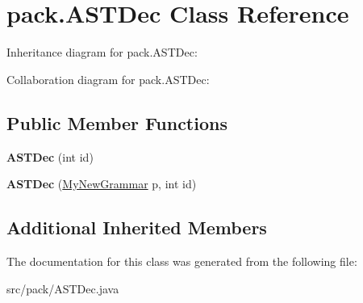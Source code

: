 \hypertarget{classpack_1_1_a_s_t_dec}{}\section{pack.\+A\+S\+T\+Dec Class Reference}
\label{classpack_1_1_a_s_t_dec}


Inheritance diagram for pack.\+A\+S\+T\+Dec\+:


Collaboration diagram for pack.\+A\+S\+T\+Dec\+:
\subsection*{Public Member Functions}
\begin{DoxyCompactItemize}
\item 
{\bfseries A\+S\+T\+Dec} (int id)\hypertarget{classpack_1_1_a_s_t_dec_ac59d8c6804c3343094d60e5dc8310d7f}{}\label{classpack_1_1_a_s_t_dec_ac59d8c6804c3343094d60e5dc8310d7f}

\item 
{\bfseries A\+S\+T\+Dec} (\hyperlink{classpack_1_1_my_new_grammar}{My\+New\+Grammar} p, int id)\hypertarget{classpack_1_1_a_s_t_dec_a366db59d11ca1c42e82ce4f39e370827}{}\label{classpack_1_1_a_s_t_dec_a366db59d11ca1c42e82ce4f39e370827}

\end{DoxyCompactItemize}
\subsection*{Additional Inherited Members}


The documentation for this class was generated from the following file\+:\begin{DoxyCompactItemize}
\item 
src/pack/A\+S\+T\+Dec.\+java\end{DoxyCompactItemize}
